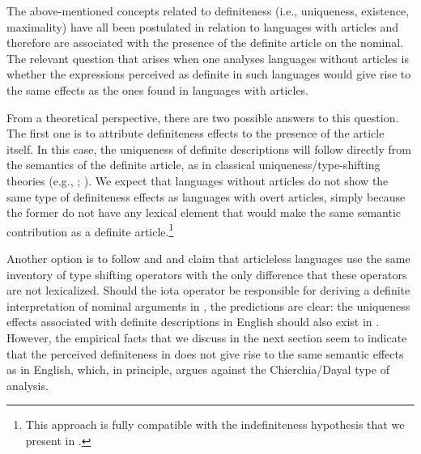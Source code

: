 \documentclass[output=paper]{langscibook}
\begin{document}

The above-mentioned concepts related to definiteness (i.e., uniqueness, existence, maximality) have all been postulated in relation to languages with articles and therefore are associated with the presence of the definite article on the nominal. The relevant question that arises when one analyses languages without articles is whether the expressions perceived as definite in such languages would give rise to the same effects as the ones found in languages with articles.

From a theoretical perspective, there are two possible answers to this question. The first one is to attribute definiteness effects to the presence of the article itself. In this case, the uniqueness of definite descriptions will follow directly from the semantics of the definite article, as in classical uniqueness/type-shifting theories (e.g., \citealt{Frege1892}; \citealt{Partee1987}). We expect that languages without articles do not show the same type of definiteness effects as languages with overt articles, simply because the former do not have any lexical element that would make the same semantic contribution as a definite article.\footnote{This approach is fully compatible with the indefiniteness hypothesis that we present in .}

Another option is to follow \citet{Chierchia1998} and \citet{Dayal2004} and claim that articleless languages use the same inventory of type shifting operators with the only difference that these operators are not lexicalized. Should the iota operator be responsible for deriving a definite interpretation of nominal arguments in , the predictions are clear: the uniqueness effects associated with definite descriptions in English should also exist in . However, the empirical facts that we discuss in the next section seem to indicate that the perceived definiteness in  does not give rise to the same semantic effects as in English, which, in principle, argues against the Chierchia/Dayal type of analysis.



\end{document}
